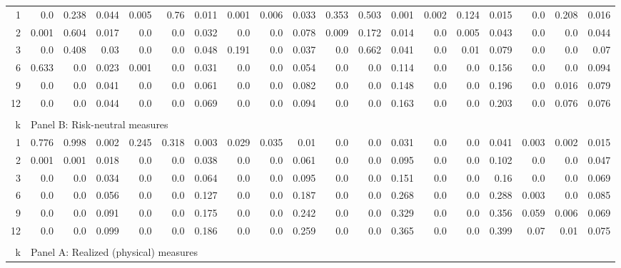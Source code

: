 \documentclass{article}
\begin{document}
\begin{landscape}
\begin{table}[h]
\begin{center}
\begin{tabular}{@{\extracolsep{5pt}}rrrrrrrrrrrrrrrrrrr@{}}
1 & 0.0 & 0.238 & 0.044 & 0.005 & 0.76 & 0.011 & 0.001 & 0.006 & 0.033 & 0.353 & 0.503 & 0.001 & 0.002 & 0.124 & 0.015 & 0.0 & 0.208 & 0.016 \\[6pt]
2 & 0.001 & 0.604 & 0.017 & 0.0 & 0.0 & 0.032 & 0.0 & 0.0 & 0.078 & 0.009 & 0.172 & 0.014 & 0.0 & 0.005 & 0.043 & 0.0 & 0.0 & 0.044 \\[6pt]
3 & 0.0 & 0.408 & 0.03 & 0.0 & 0.0 & 0.048 & 0.191 & 0.0 & 0.037 & 0.0 & 0.662 & 0.041 & 0.0 & 0.01 & 0.079 & 0.0 & 0.0 & 0.07 \\[6pt]
6 & 0.633 & 0.0 & 0.023 & 0.001 & 0.0 & 0.031 & 0.0 & 0.0 & 0.054 & 0.0 & 0.0 & 0.114 & 0.0 & 0.0 & 0.156 & 0.0 & 0.0 & 0.094 \\[6pt]
9 & 0.0 & 0.0 & 0.041 & 0.0 & 0.0 & 0.061 & 0.0 & 0.0 & 0.082 & 0.0 & 0.0 & 0.148 & 0.0 & 0.0 & 0.196 & 0.0 & 0.016 & 0.079 \\[6pt]
12 & 0.0 & 0.0 & 0.044 & 0.0 & 0.0 & 0.069 & 0.0 & 0.0 & 0.094 & 0.0 & 0.0 & 0.163 & 0.0 & 0.0 & 0.203 & 0.0 & 0.076 & 0.076 \\[6pt]

\hline\\[0.000000001pt]

k & \multicolumn{18}{l}{Panel B: Risk-neutral measures} \\[7pt]

\hline

1 & 0.776 & 0.998 & 0.002 & 0.245 & 0.318 & 0.003 & 0.029 & 0.035 & 0.01 & 0.0 & 0.0 & 0.031 & 0.0 & 0.0 & 0.041 & 0.003 & 0.002 & 0.015 \\[6pt]
2 & 0.001 & 0.001 & 0.018 & 0.0 & 0.0 & 0.038 & 0.0 & 0.0 & 0.061 & 0.0 & 0.0 & 0.095 & 0.0 & 0.0 & 0.102 & 0.0 & 0.0 & 0.047 \\[6pt]
3 & 0.0 & 0.0 & 0.034 & 0.0 & 0.0 & 0.064 & 0.0 & 0.0 & 0.095 & 0.0 & 0.0 & 0.151 & 0.0 & 0.0 & 0.16 & 0.0 & 0.0 & 0.069 \\[6pt]
6 & 0.0 & 0.0 & 0.056 & 0.0 & 0.0 & 0.127 & 0.0 & 0.0 & 0.187 & 0.0 & 0.0 & 0.268 & 0.0 & 0.0 & 0.288 & 0.003 & 0.0 & 0.085 \\[6pt]
9 & 0.0 & 0.0 & 0.091 & 0.0 & 0.0 & 0.175 & 0.0 & 0.0 & 0.242 & 0.0 & 0.0 & 0.329 & 0.0 & 0.0 & 0.356 & 0.059 & 0.006 & 0.069 \\[6pt]
12 & 0.0 & 0.0 & 0.099 & 0.0 & 0.0 & 0.186 & 0.0 & 0.0 & 0.259 & 0.0 & 0.0 & 0.365 & 0.0 & 0.0 & 0.399 & 0.07 & 0.01 & 0.075 \\[6pt]

\hline\\[0.000000001pt]

k & \multicolumn{18}{l}{Panel A: Realized (physical) measures} \\[7pt]


\end{tabular}
\end{center}
\end{table}
\end{landscape}
\end{document}
